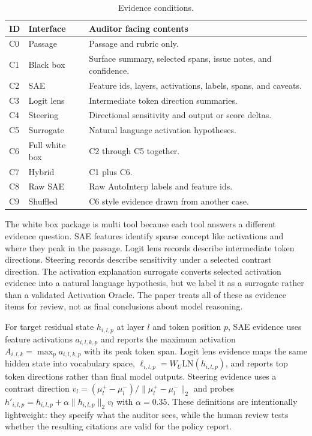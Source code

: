 \documentclass{article}
\begin{document}
\begin{table}[h!]
    \centering
    \caption{Evidence conditions.}
    \label{tab:conditions}
    \scriptsize
    \setlength{\tabcolsep}{3pt}
    \begin{tabular}{@{}p{}p{}p{}@{}}
        \toprule
        ID & Interface & Auditor facing contents \\
        \midrule
        C0 & Passage & Passage and rubric only. \\
        C1 & Black box & Surface summary, selected spans, issue notes, and confidence. \\
        C2 & SAE & Feature ids, layers, activations, labels, spans, and caveats. \\
        C3 & Logit lens & Intermediate token direction summaries. \\
        C4 & Steering & Directional sensitivity and output or score deltas. \\
        C5 & Surrogate & Natural language activation hypotheses. \\
        C6 & Full white box & C2 through C5 together. \\
        C7 & Hybrid & C1 plus C6. \\
        C8 & Raw SAE & Raw AutoInterp labels and feature ids. \\
        C9 & Shuffled & C6 style evidence drawn from another case. \\
        \bottomrule
    \end{tabular}
\end{table}

The white box package is multi tool because each tool answers a different evidence question. SAE features identify sparse concept like activations and where they peak in the passage. Logit lens records describe intermediate token directions. Steering records describe sensitivity under a selected contrast direction. The activation explanation surrogate converts selected activation evidence into a natural language hypothesis, but we label it as a surrogate rather than a validated Activation Oracle. The paper treats all of these as evidence items for review, not as final conclusions about model reasoning.

For target residual state $h_{i,l,p}$ at layer $l$ and token position $p$, SAE evidence uses feature activations $a_{i,l,k,p}$ and reports the maximum activation $A_{i,l,k}=\max_p a_{i,l,k,p}$ with its peak token span. Logit lens evidence maps the same hidden state into vocabulary space, $\ell_{i,l,p}=W_U\mathrm{LN}(h_{i,l,p})$, and reports top token directions rather than final model outputs. Steering evidence uses a contrast direction $v_l=(\mu_l^{+}-\mu_l^{-})/\|\mu_l^{+}-\mu_l^{-}\|_2$ and probes $h'_{i,l,p}=h_{i,l,p}+\alpha\|h_{i,l,p}\|_2v_l$ with $\alpha=0.35$. These definitions are intentionally lightweight: they specify what the auditor sees, while the human review tests whether the resulting citations are valid for the policy report.
\end{document}
